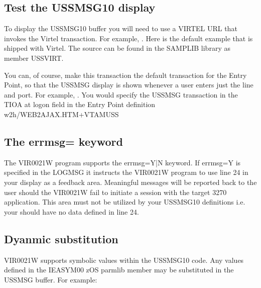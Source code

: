 \documentclass[letterpaper,10pt,english]{sphinxmanual}
\begin{document}
\subsection{Test the USSMSG10 display}
\label{\detokenize{Customization:test-the-ussmsg10-display}}
\sphinxAtStartPar
To display the USSMSG10 buffer you will need to use a VIRTEL URL that invokes the Virtel transaction. For example, . Here is the default example that is shipped with Virtel. The source can be found in the SAMPLIB library as member USSVIRT.

\sphinxAtStartPar
{}

\sphinxAtStartPar
{}

\sphinxAtStartPar
You can, of course, make this transaction the default transaction for the Entry Point, so that the USSMSG display is shown whenever a user enters just the line and port. For example, . You would specify the USSMSG transaction in the TIOA at logon field in the Entry Point definition \sphinxhyphen{} w2h/WEB2AJAX.HTM+VTAMUSS


\subsection{The errmsg= keyword}
\label{\detokenize{Customization:the-errmsg-keyword}}
\sphinxAtStartPar
The VIR0021W program supports the errmsg=Y|N keyword. If errmsg=Y is specified in the LOGMSG it instructs the VIR0021W program to use line 24 in your display as a feedback area. Meaningful messages will be reported back to the user should the VIR0021W fail to initiate a session with the target 3270 application. This area must not be utilized by your USSMSG10 definitions i.e. your should have no data defined in line 24.


\subsection{Dyanmic substitution}
\label{\detokenize{Customization:dyanmic-substitution}}
\sphinxAtStartPar
VIR0021W supports symbolic values within the USSMSG10 code. Any values defined in the IEASYM00 zOS parmlib member may be substituted in the USSMSG buffer. For example:\sphinxhyphen{}

\begin{sphinxVerbatim}[commandchars=\\\{\}]
 
\end{sphinxVerbatim}
\end{document}
